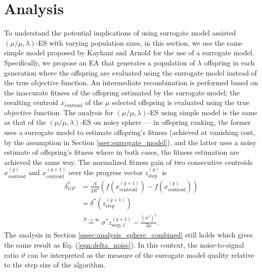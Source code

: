 

\section{Analysis}\label{sec:analysis}

To understand the potential implications of using surrogate model assisted $(\mu/\mu,\lambda)$-ES with varying population sizes, in this section, we use the same simple model proposed by Kayhani and Arnold \cite{DBLP:conf/ppsn/KayhaniA18} for the use of a surrogate model. Specifically, we propose an EA that generates a population of $\lambda$ offspring in each generation where the offspring are evaluated using the surrogate model instead of the true objective function. An intermediate recombination is performed based on the inaccurate fitness of the offspring estimated by the surrogate model; the resulting centroid $x_{\text{centroid}}$ of the $\mu$ selected offspring is evaluated using the true objective function. The analysis for $(\mu/\mu,\lambda)$-ES using simple model is the same as that of the $(\mu/\mu,\lambda)$-ES on noisy sphere --- in offspring ranking, the former uses a surrogate model to estimate offspring's fitness (achieved at vanishing cost, by the assumption in Section \ref{ssec:surrogate_model}), and the latter uses a noisy estimate of offspring's fitness where in both cases, the fitness estimation are achieved the same way. The normalized fitness gain of two consecutive centroids $x_{\text{centroid}}^{(g)}$ and $x_{\text{centroid}}^{(g+1)}$ over the progress vector $z_{\text{step}}^{(g)}$ is 
\begin{align}
\delta_{GP}^* &=  \frac{N}{2R^2}\left( f( x_{\text{centroid}}^{(g+1)} ) - f( x_{\text{centroid}}^{(g)} ) \right)  \nonumber\\ 
& = \delta^*(z_{\text{step}}^{(g+1)}) \nonumber\\ 
&\overset{N \rightarrow \infty}{=} \sigma^* z_{\text{step},1}^{(g+1)}   - \frac{(\sigma^*)^2}{2 \mu}. \label{eqn:delta_surrogate}{}
\end{align}
The analysis in Section \ref{sssec:analysis_sphere_combined} still holds which gives the same result as Eq. (\ref{eqn:delta_noise}). In this context, the noise-to-signal ratio $\vartheta$ can be interpreted as the measure of the surrogate model quality relative to the step size of the algorithm. 
